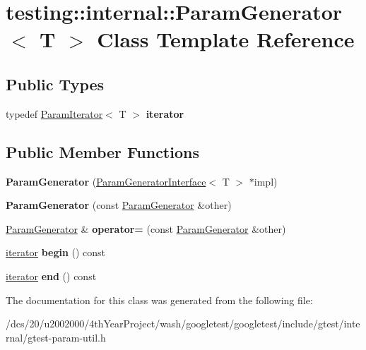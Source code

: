 \hypertarget{classtesting_1_1internal_1_1ParamGenerator}{}\section{testing\+:\+:internal\+:\+:Param\+Generator$<$ T $>$ Class Template Reference}
\label{classtesting_1_1internal_1_1ParamGenerator}
\subsection*{Public Types}
\begin{DoxyCompactItemize}
\item 
\mbox{\label{classtesting_1_1internal_1_1ParamGenerator_a448b08a8eaae1f1d27840d4dbd66c357}} 
typedef \mbox{\hyperlink{classtesting_1_1internal_1_1ParamIterator}{Param\+Iterator}}$<$ T $>$ {\bfseries iterator}
\end{DoxyCompactItemize}
\subsection*{Public Member Functions}
\begin{DoxyCompactItemize}
\item 
\mbox{\label{classtesting_1_1internal_1_1ParamGenerator_a6b017d4d030927714d495ee95ae92fbc}} 
{\bfseries Param\+Generator} (\mbox{\hyperlink{classtesting_1_1internal_1_1ParamGeneratorInterface}{Param\+Generator\+Interface}}$<$ T $>$ $\ast$impl)
\item 
\mbox{\label{classtesting_1_1internal_1_1ParamGenerator_a5891d25c31919b3099489f8bbcd58b5e}} 
{\bfseries Param\+Generator} (const \mbox{\hyperlink{classtesting_1_1internal_1_1ParamGenerator}{Param\+Generator}} \&other)
\item 
\mbox{\label{classtesting_1_1internal_1_1ParamGenerator_a590a03c6e0a3a3ac6279943ad1f01dc8}} 
\mbox{\hyperlink{classtesting_1_1internal_1_1ParamGenerator}{Param\+Generator}} \& {\bfseries operator=} (const \mbox{\hyperlink{classtesting_1_1internal_1_1ParamGenerator}{Param\+Generator}} \&other)
\item 
\mbox{\label{classtesting_1_1internal_1_1ParamGenerator_a14e735c8bd113556ae905a560cd2d607}} 
\mbox{\hyperlink{classtesting_1_1internal_1_1ParamIterator}{iterator}} {\bfseries begin} () const
\item 
\mbox{\label{classtesting_1_1internal_1_1ParamGenerator_aaf8f75df1099a07ff771a550b48f9fbe}} 
\mbox{\hyperlink{classtesting_1_1internal_1_1ParamIterator}{iterator}} {\bfseries end} () const
\end{DoxyCompactItemize}


The documentation for this class was generated from the following file\+:\begin{DoxyCompactItemize}
\item 
/dcs/20/u2002000/4th\+Year\+Project/wash/googletest/googletest/include/gtest/internal/gtest-\/param-\/util.\+h\end{DoxyCompactItemize}
